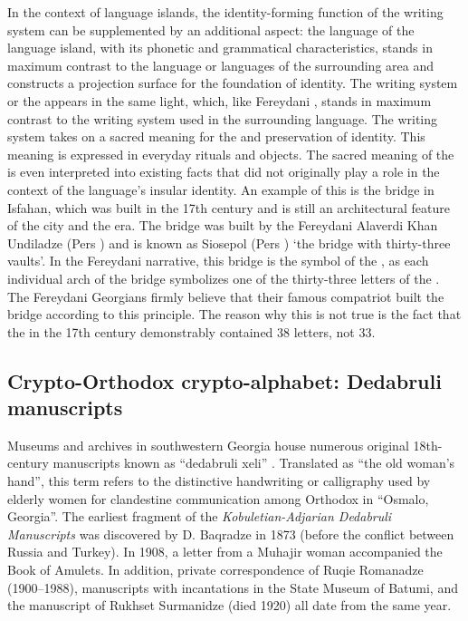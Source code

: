 \documentclass[output=paper,colorlinks,citecolor=brown,arabicfont,georgian]{langscibook}
\begin{document}
In the context of language islands, the identity-forming function of the writing system can be supplemented by an additional aspect: the language of the language island, with its phonetic and grammatical characteristics, stands in maximum contrast to the language or languages of the surrounding area and constructs a projection surface for the foundation of identity. The writing system or the   appears in the same light, which, like Fereydani , stands in maximum contrast to the  writing system used in the surrounding  language. The writing system takes on a sacred meaning for the  and preservation of identity. This meaning is expressed in everyday rituals and objects. The sacred meaning of the   is even interpreted into existing facts that did not originally play a role in the context of the language's insular identity. An example of this is the bridge in Isfahan, which was built in the 17th century and is still an architectural feature of the city and the era. The bridge was built by the Fereydani  Alaverdi Khan Undiladze (Pers ) and is known as Siosepol (Pers ) `the bridge with thirty-three vaults'. In the Fereydani  narrative, this bridge is the symbol of the  , as each individual arch of the bridge symbolizes one of the thirty-three letters of the  . The Fereydani Georgians firmly believe that their famous compatriot built the bridge according to this principle. The reason why this is not true is the fact that the   in the 17th century demonstrably contained 38 letters, not 33.

\subsection{Crypto-Orthodox crypto-alphabet: Dedabruli manuscripts}\label{3.8.ss.2.2}

%
Museums and archives in southwestern Georgia house numerous original 18th-century manuscripts known as ``dedabruli xeli'' \citep{khakhutashvili2017}. Translated as ``the old woman's hand'',
this term refers to the distinctive handwriting or calligraphy used by elderly women for clandestine communication among Orthodox  in ``Osmalo, Georgia''.
The earliest fragment of the \textit{Kobuletian-Adjarian Dedabruli Manuscripts} was discovered by D. Baqradze in 1873 (before the conflict between Russia and Turkey). In 1908, a letter from a Muhajir woman accompanied the Book of Amulets. In addition, private correspondence of Ruqie Romanadze (1900--1988), manuscripts with  incantations in the State Museum of Batumi, and the manuscript of Rukhset Surmanidze (died 1920) all date from the same year.
%
\end{document}
